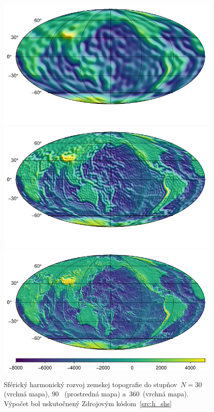 \documentclass[a4paper, 12pt]{book}
\begin{document}
\begin{figure}
\centering
\includegraphics{./fig-h-shs-nmax30.pdf}
\includegraphics{./fig-h-shs-nmax90.pdf}
\includegraphics{./fig-h-shs-nmax360.pdf}
\caption{Sférický harmonický rozvoj zemskej topografie do stupňov~$N = 30$ 
(vrchná mapa), $90$~ (prostredná mapa) a~$360$~(vrchná mapa).  Výpočet bol 
uskutočnený Zdrojovým kódom~\ref{src:h_shs}}
\label{fig:shs_h}
\end{figure}
\end{document}

